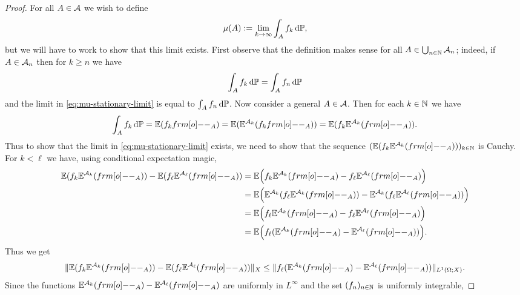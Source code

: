 \begin{proof}
  For all $A \in \mathcal{A}$ we wish to define
  \begin{equation}\label{eq:mu-stationary-limit}
    \mu(A) := \lim_{k \to \infty} \int_A f_k \, \mathrm{d}\mathbb{P},
  \end{equation}
  but we will have to work to show that this limit exists.
  First observe that the definition makes sense for all $A \in \bigcup_{n \in \mathbb{N}} \mathcal{A}_{n}$; indeed, if $A \in \mathcal{A}_{n}$ then for $k \geq n$ we have
  \begin{equation*}
    \int_A f_k \, \mathrm{d}\mathbb{P} = \int_A f_n \, \mathrm{d} \mathbb{P}
  \end{equation*}
  and the limit in \eqref{eq:mu-stationary-limit} is equal to $\int_A f_n \, \mathrm{d}\mathbb{P}$.
  Now consider a general $A \in \mathcal{A}$.
  Then for each $k \in \mathbb{N}$ we have
  \begin{equation*}
     \int_A f_k \, \dd\P = \E(f_k \1_{A}) = \E(\E^{\mc{A}_k}(f_k \1_{A})) = \E(f_k \E^{\mc{A}_k}(\1_{A})).
   \end{equation*}
   Thus to show that the limit in \eqref{eq:mu-stationary-limit} exists, we need to show that the sequence $(\E(f_k \E^{\mc{A}_k}( \1_{A})))_{k \in \N}$ is Cauchy.
   For $k < \ell$ we have, using conditional expectation magic,
   \begin{equation*}
     \begin{aligned}
       \E(f_k \E^{\mc{A}_k}(\1_{A})) - \E(f_\ell \E^{\mc{A}_\ell}( \1_{A}))
       &= \E \Big( f_k \E^{\mc{A}_k}(\1_{A}) - f_{\ell} \E^{\mc{A}_\ell}( \1_{A})\Big) \\
       &= \E \Big(  \E^{\mc{A}_{k}}(f_\ell \E^{\mc{A}_k}(\1_{A})) - \E^{\mc{A}_{k}}(f_{\ell} \E^{\mc{A}_\ell}( \1_{A}) )\Big) \\
       &= \E \Big(  f_\ell \E^{\mc{A}_k}(\1_{A}) - f_{\ell} \E^{\mc{A}_\ell}( \1_{A}) \Big) \\
       &= \E \Big(  f_\ell (\E^{\mc{A}_k}(\1_{A}) - \E^{\mc{A}_\ell}( \1_{A}))\Big).
     \end{aligned}
   \end{equation*}
   Thus we get
   \begin{equation*}
     \|\E(f_k \E^{\mc{A}_k}(\1_{A})) - \E(f_\ell \E^{\mc{A}_\ell}( \1_{A}))\|_{X}
     \leq \|  f_\ell (\E^{\mc{A}_k}(\1_{A}) - \E^{\mc{A}_\ell}( \1_{A})) \|_{L^1(\Omega;X)}.
   \end{equation*}
   Since the functions $\E^{\mc{A}_k}(\1_{A}) - \E^{\mc{A}_\ell}( \1_{A})$ are uniformly in $L^\infty$ and the set $(f_{n})_{n \in \mathbb{N}}$ is uniformly integrable,
\end{proof}


